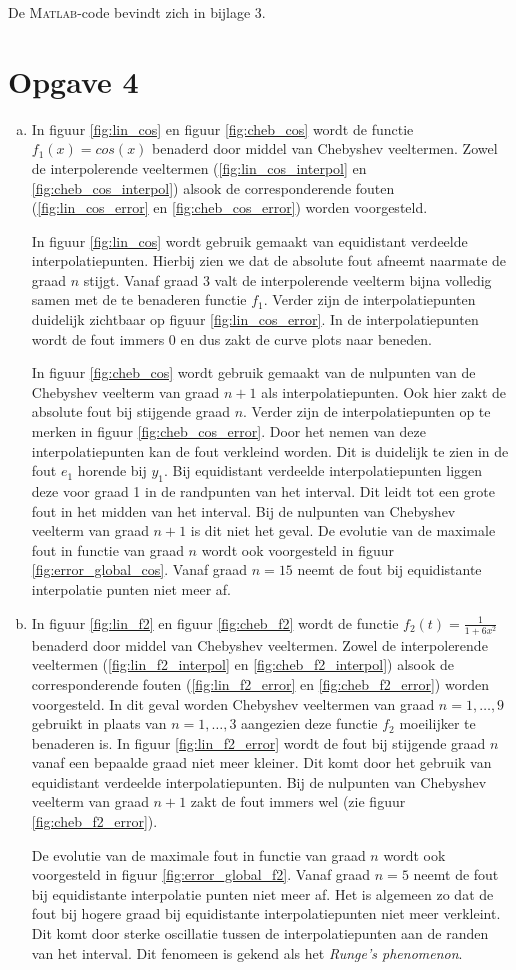 \documentclass[a4paper]{article}
\newcommand{\opgave}[1]{\section*{Opgave #1}}
\begin{document}
De \textsc{Matlab}-code bevindt zich in bijlage 3.
\opgave{4}
\begin{enumerate}[a)] %
\item
In figuur \ref{fig:lin_cos} en figuur \ref{fig:cheb_cos} wordt de functie $f_{1}(x) = cos(x)$ benaderd door middel van Chebyshev veeltermen. Zowel de interpolerende veeltermen  (\ref{fig:lin_cos_interpol} en \ref{fig:cheb_cos_interpol}) alsook de corresponderende fouten (\ref{fig:lin_cos_error} en \ref{fig:cheb_cos_error}) worden voorgesteld. 

In figuur \ref{fig:lin_cos} wordt gebruik gemaakt van equidistant verdeelde interpolatiepunten. Hierbij zien we dat de absolute fout afneemt naarmate de graad $n$ stijgt. Vanaf graad 3 valt de interpolerende veelterm bijna volledig samen met de te benaderen functie $f_{1}$. Verder zijn de interpolatiepunten duidelijk zichtbaar op figuur \ref{fig:lin_cos_error}. In de interpolatiepunten wordt de fout immers 0 en dus zakt de curve plots naar beneden.

In figuur \ref{fig:cheb_cos} wordt gebruik gemaakt van de nulpunten van de Chebyshev veelterm van graad $n+1$ als interpolatiepunten. Ook hier zakt de absolute fout bij stijgende graad $n$. Verder zijn de interpolatiepunten op te merken in figuur \ref{fig:cheb_cos_error}. Door het nemen van deze interpolatiepunten kan de fout verkleind worden. Dit is duidelijk te zien in de fout $e_{1}$ horende bij $y_{1}$. Bij equidistant verdeelde interpolatiepunten liggen deze voor graad 1 in de randpunten van het interval. Dit leidt tot een grote fout in het midden van het interval. Bij de nulpunten van Chebyshev veelterm van graad $n+1$ is dit niet het geval. De evolutie van de maximale fout in functie van graad $n$ wordt ook voorgesteld in figuur \ref{fig:error_global_cos}. Vanaf graad $n = 15$ neemt de fout bij equidistante interpolatie punten niet meer af.
\item
In figuur \ref{fig:lin_f2} en figuur \ref{fig:cheb_f2} wordt de functie $f_{2}(t) = \frac{1}{1+6x^{2}}$ benaderd door middel van Chebyshev veeltermen. Zowel de interpolerende veeltermen  (\ref{fig:lin_f2_interpol} en \ref{fig:cheb_f2_interpol}) alsook de corresponderende fouten (\ref{fig:lin_f2_error} en \ref{fig:cheb_f2_error}) worden voorgesteld. In dit geval worden Chebyshev veeltermen van graad $n=1,\dots,9$ gebruikt in plaats van $n=1,\dots,3$ aangezien deze functie $f_{2}$ moeilijker te benaderen is. In figuur \ref{fig:lin_f2_error} wordt de fout bij stijgende graad $n$ vanaf een bepaalde graad niet meer kleiner. Dit komt door het gebruik van equidistant verdeelde interpolatiepunten. Bij de nulpunten van Chebyshev veelterm van graad $n+1$ zakt de fout immers wel (zie figuur \ref{fig:cheb_f2_error}). 

De evolutie van de maximale fout in functie van graad $n$ wordt ook voorgesteld in figuur \ref{fig:error_global_f2}. Vanaf graad $n=5$ neemt de fout bij equidistante interpolatie punten niet meer af. Het is algemeen zo dat de fout bij hogere graad bij equidistante interpolatiepunten niet meer verkleint. Dit komt door sterke oscillatie tussen de interpolatiepunten aan de randen van het interval. Dit fenomeen is gekend als het \textit{Runge's phenomenon}.
\end{enumerate}
\end{document}
